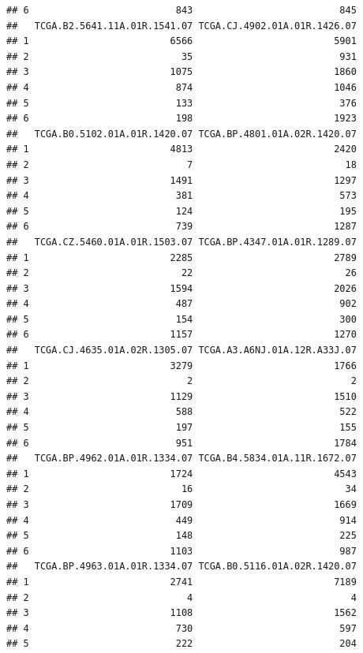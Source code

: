 \documentclass[
]{article}
\begin{document}
\begin{verbatim}
## 6                          843                          845
##   TCGA.B2.5641.11A.01R.1541.07 TCGA.CJ.4902.01A.01R.1426.07
## 1                         6566                         5901
## 2                           35                          931
## 3                         1075                         1860
## 4                          874                         1046
## 5                          133                          376
## 6                          198                         1923
##   TCGA.B0.5102.01A.01R.1420.07 TCGA.BP.4801.01A.02R.1420.07
## 1                         4813                         2420
## 2                            7                           18
## 3                         1491                         1297
## 4                          381                          573
## 5                          124                          195
## 6                          739                         1287
##   TCGA.CZ.5460.01A.01R.1503.07 TCGA.BP.4347.01A.01R.1289.07
## 1                         2285                         2789
## 2                           22                           26
## 3                         1594                         2026
## 4                          487                          902
## 5                          154                          300
## 6                         1157                         1270
##   TCGA.CJ.4635.01A.02R.1305.07 TCGA.A3.A6NJ.01A.12R.A33J.07
## 1                         3279                         1766
## 2                            2                            2
## 3                         1129                         1510
## 4                          588                          522
## 5                          197                          155
## 6                          951                         1784
##   TCGA.BP.4962.01A.01R.1334.07 TCGA.B4.5834.01A.11R.1672.07
## 1                         1724                         4543
## 2                           16                           34
## 3                         1709                         1669
## 4                          449                          914
## 5                          148                          225
## 6                         1103                          987
##   TCGA.BP.4963.01A.01R.1334.07 TCGA.B0.5116.01A.02R.1420.07
## 1                         2741                         7189
## 2                            4                            4
## 3                         1108                         1562
## 4                          730                          597
## 5                          222                          204

\end{verbatim}
\end{document}
